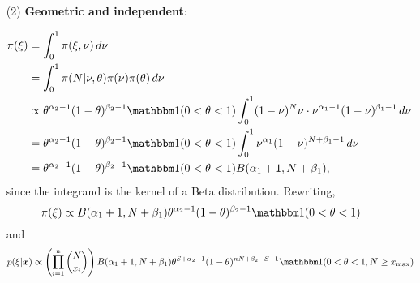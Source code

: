 \begin{enumerate}

    \item[(2)] {\bf Geometric and independent}: 
        
    \begin{equation*}
        \begin{split}
            \pi(\xi) &= \int_0^{1} \pi(\xi, \nu) \, d\nu \\
            &= \int_0^{1} \pi(N|\nu,\theta)\pi(\nu)\pi(\theta) \, d\nu \\
            &\propto \theta^{\alpha_2-1}(1-\theta)^{\beta_2-1} \one(0<\theta<1) \int_0^{1} (1-\nu)^N\nu \cdot\nu^{\alpha_1 - 1}(1-\nu)^{\beta_1-1}\, d\nu \\
            &= \theta^{\alpha_2-1}(1-\theta)^{\beta_2-1} \one(0<\theta<1) \int_0^{1} \nu^{\alpha_1}(1-\nu)^{N+\beta_1-1}\, d\nu \\
            &= \theta^{\alpha_2-1}(1-\theta)^{\beta_2-1} \one(0<\theta<1) B(\alpha_1+1,N+\beta_1), 
        \end{split}
    \end{equation*}
    since the integrand is the kernel of a Beta distribution. Rewriting, 
    \begin{equation}
        \label{eq:prior-geom-iden}
        \pi(\xi) \propto B(\alpha_1+1,N+\beta_1)\theta^{\alpha_2-1}(1-\theta)^{\beta_2-1} \one(0<\theta<1) 
    \end{equation}
    and 
    \begin{equation}
        \label{eq:posterior-geom-iden}
        p(\xi|\bx) \propto \left(\prod_{i=1}^n \binom{N}{x_i}\right) B(\alpha_1+1,N+\beta_1)\theta^{S + \alpha_2-1}(1-\theta)^{nN + \beta_2-S-1} \one(0<\theta<1, N \ge x_{\max}) 
    \end{equation}


\end{enumerate}

